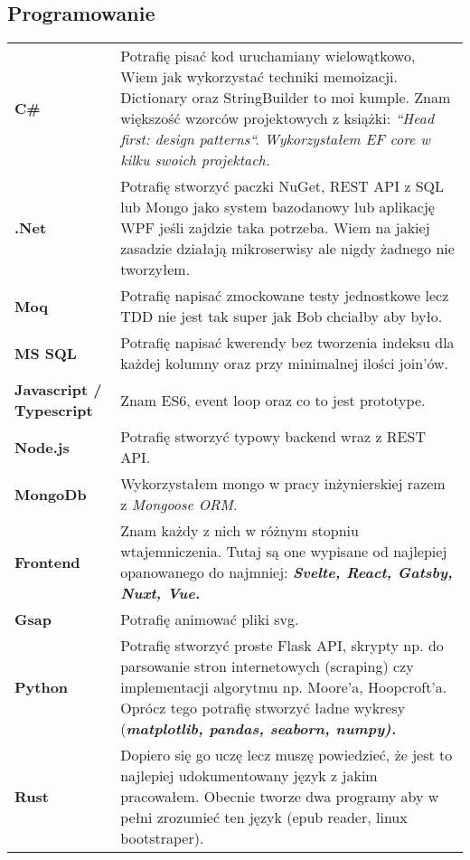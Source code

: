 \documentclass[10pt]{article}
\renewcommand{\arraystretch}{0}
\begin{document}
\subsection{Programowanie}
\renewcommand{\arraystretch}{2.5}
\begin{table}[H]
    \begin{tabularx}{\textwidth}{@{}l X}
         \textbf{C\#} & Potrafię pisać kod uruchamiany wielowątkowo, Wiem jak wykorzystać techniki memoizacji. Dictionary oraz StringBuilder to moi kumple. Znam większość wzorców projektowych z książki: \em ``Head first: design patterns``. Wykorzystałem EF core w kilku swoich projektach.\\
         \textbf{.Net} & Potrafię stworzyć paczki NuGet, REST API z SQL lub Mongo jako system bazodanowy lub aplikację WPF jeśli zajdzie taka potrzeba. Wiem na jakiej zasadzie działają mikroserwisy ale nigdy żadnego nie tworzyłem. \\
         \textbf{Moq} & Potrafię napisać zmockowane testy jednostkowe lecz TDD nie jest tak super jak Bob chciałby aby było.  \\
         \textbf{MS SQL} & Potrafię napisać kwerendy bez tworzenia indeksu dla każdej kolumny oraz przy minimalnej ilości join'ów. \\
	 \textbf{Javascript / Typescript} & Znam ES6, event loop oraz co to jest prototype.\\
	 \textbf{Node.js} & Potrafię stworzyć typowy backend wraz z REST API.\\
         \textbf{MongoDb} & Wykorzystałem mongo w pracy inżynierskiej razem z \emph{Mongoose ORM}. \\
         \textbf{Frontend} & Znam każdy z nich w różnym stopniu wtajemniczenia. Tutaj są one wypisane od najlepiej opanowanego do najmniej: \bfseries \em Svelte, React, Gatsby, Nuxt, Vue. \\
         \textbf{Gsap} & Potrafię animować pliki svg.\\
         \textbf{Python} & Potrafię stworzyć proste Flask API, skrypty np. do parsowanie stron internetowych (scraping) czy implementacji algorytmu np. Moore'a, Hoopcroft'a. Oprócz tego potrafię stworzyć ładne wykresy (\bfseries \em matplotlib, pandas, seaborn, numpy). \\
         \textbf{Rust} &Dopiero się go uczę lecz muszę powiedzieć, że jest to najlepiej udokumentowany język z jakim pracowałem. Obecnie tworze dwa programy aby w pełni zrozumieć ten język (epub reader, linux bootstraper). \\
    \end{tabularx}
\end{table}
\end{document}
